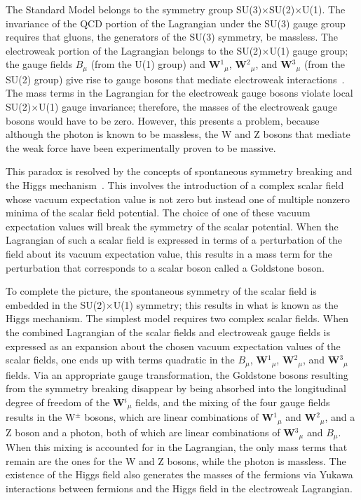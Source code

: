 The Standard Model belongs to the symmetry group SU(3)$\times$SU(2)$\times$U(1). The invariance of the QCD portion of the Lagrangian under the SU(3) gauge group requires that gluons, the generators of the SU(3) symmetry, be massless. The electroweak portion of the Lagrangian belongs to the SU(2)$\times$U(1) gauge group; the gauge fields $B_{\mu}$ (from the U(1) group) and \textbf{W}$^1$$_{\mu}$, \textbf{W}$^2$$_{\mu}$, and \textbf{W}$^3$$_{\mu}$ (from the SU(2) group) give rise to gauge bosons that mediate electroweak interactions~\cite{Bednyakov:2007pz}. The mass terms in the Lagrangian for the electroweak gauge bosons violate local SU(2)$\times$U(1) gauge invariance; therefore, the masses of the electroweak gauge bosons would have to be zero. However, this presents a problem, because although the photon is known to be massless, the W and Z bosons that mediate the weak force have been experimentally proven to be massive.

This paradox is resolved by the concepts of spontaneous symmetry breaking and the Higgs mechanism~\cite{ThomsonPhysics}. This involves the introduction of a complex scalar field whose vacuum expectation value is not zero but instead one of multiple nonzero minima of the scalar field potential. The choice of one of these vacuum expectation values will break the symmetry of the scalar potential. When the Lagrangian of such a scalar field is expressed in terms of a perturbation of the field about its vacuum expectation value, this results in a mass term for the perturbation that corresponds to a scalar boson called a Goldstone boson.

To complete the picture, the spontaneous symmetry of the scalar field is embedded in the SU(2)$\times$U(1) symmetry; this results in what is known as the Higgs mechanism. The simplest model requires two complex scalar fields. When the combined Lagrangian of the scalar fields and electroweak gauge fields is expressed as an expansion about the chosen vacuum expectation values of the scalar fields, one ends up with terms quadratic in the $B_{\mu}$, \textbf{W}$^1$$_{\mu}$, \textbf{W}$^2$$_{\mu}$, and \textbf{W}$^3$$_{\mu}$ fields. Via an appropriate gauge transformation, the Goldstone bosons resulting from the symmetry breaking disappear by being absorbed into the longitudinal degree of freedom of the \textbf{W}$^i$$_{\mu}$ fields, and the mixing of the four gauge fields results in the W$^{\pm}$ bosons, which are linear combinations of \textbf{W}$^1$$_{\mu}$ and \textbf{W}$^2$$_{\mu}$, and a Z boson and a photon, both of which are linear combinations of \textbf{W}$^3$$_{\mu}$ and $B_{\mu}$. When this mixing is accounted for in the Lagrangian, the only mass terms that remain are the ones for the W and Z bosons, while the photon is massless. The existence of the Higgs field also generates the masses of the fermions via Yukawa interactions between fermions and the Higgs field in the electroweak Lagrangian.

